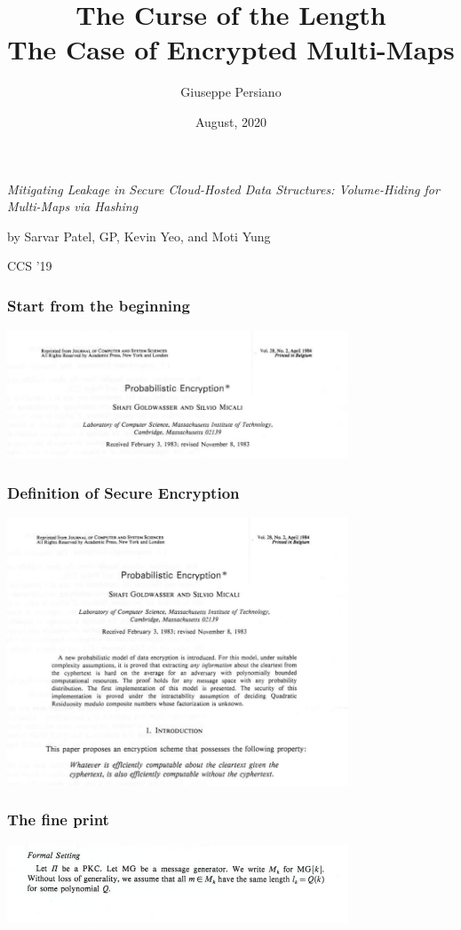 \documentclass[]{beamer}
\title[]{The Curse of the Length\\ The Case of Encrypted Multi-Maps}
\author{Giuseppe Persiano}
\institute[UNISA]{%
Universit\`a di Salerno\\ \qquad \\
}
\date[August 2020]{August, 2020}
\begin{document}
\newcommand{\zu}{\{0,1\}}
\newcommand{\ignore}[1]{}

{
\begin{frame}
  \titlepage



{\color{magenta}
{\em Mitigating Leakage in Secure Cloud-Hosted Data Structures: Volume-Hiding for
Multi-Maps via Hashing}
}

{\color{brown}
by Sarvar Patel, GP, Kevin Yeo, and Moti Yung 

CCS '19
}
\end{frame}



\begin{frame}
\frametitle{Start from the beginning}
\begin{center}
\includegraphics[width=4in]{imgs/GM1.png}
\end{center}
\end{frame}

\begin{frame}
\frametitle{Definition of Secure Encryption}
\begin{center}
\includegraphics[width=4in]{imgs/GM2.png}
\end{center}
\end{frame}

\begin{frame}
\frametitle{The fine print}
\begin{center}
\includegraphics[width=4in]{imgs/GM3.png}
\end{center}


\end{frame}}
\end{document}
